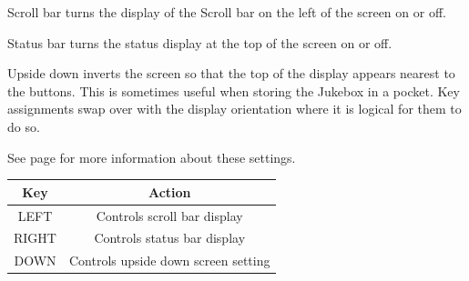 {Scroll bar turns the display of the Scroll bar on the left of the screen
on or off.

Status bar turns the status display at the top of the screen on or off.

Upside down inverts the screen so that the top of the display appears
nearest to the buttons.  This is sometimes useful when storing the
Jukebox in a pocket.  Key assignments swap over with the display
orientation where it is logical for them to do so.

See page \pageref{ref:Displayoptions} for more information about these
settings.

\begin{table}[h!]
  \begin{center}
    \begin{tabular}{@{}cc@{}}\toprule
      \textbf{Key} & \textbf{Action} \\\midrule
      LEFT & Controls scroll bar display \\
      RIGHT & Controls status bar display \\
      DOWN & Controls upside down screen setting \\\bottomrule
    \end{tabular}
  \end{center}
\end{table}
}
